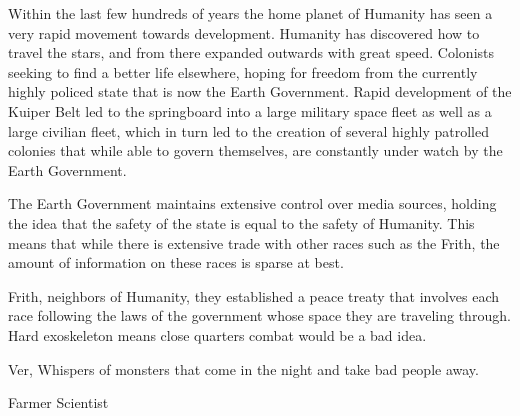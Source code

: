 \documentclass[blue]{guildcamp4}
\begin{document}
\name{\bEarth{}}

Within the last few hundreds of years the home planet of Humanity has seen a very rapid movement towards development. Humanity has discovered how to travel the stars, and from there expanded outwards with great speed. Colonists seeking to find a better life elsewhere, hoping for freedom from the currently highly policed state that is now the Earth Government. Rapid development of the Kuiper Belt led to the springboard into a large military space fleet as well as a large civilian fleet, which in turn led to the creation of several highly patrolled colonies that while able to govern themselves, are constantly under watch by the Earth Government.

The Earth Government maintains extensive control over media sources, holding the idea that the safety of the state is equal to the safety of Humanity. This means that while there is extensive trade with other races such as the Frith, the amount of information on these races is sparse at best.

Frith, neighbors of Humanity, they established a peace treaty that involves each race following the laws of the government whose space they are traveling through. Hard exoskeleton means close quarters combat would be a bad idea.

Ver, Whispers of monsters that come in the night and take bad people away.


\begin{members}
	\member{\cPlead{}} Farmer
	\member{\cSpite{}} Scientist

\end{members}
\end{document}
